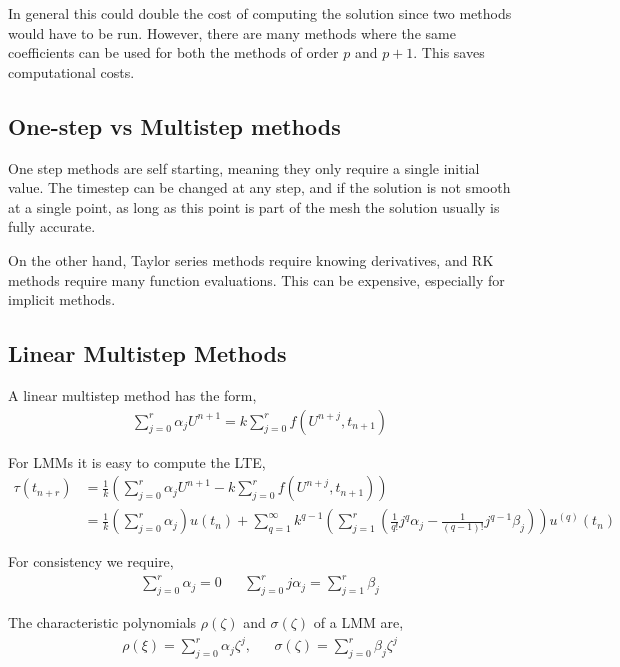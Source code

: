 \documentclass[12pt]{article}
\begin{document}
In general this could double the cost of computing the solution since two methods would have to be run. However, there are many methods where the same coefficients can be used for both the methods of order \( p \) and \( p+1 \). This saves computational costs.

\subsection{One-step vs Multistep methods}
One step methods are self starting, meaning they only require a single initial value. The timestep can be changed at any step, and if the solution is not smooth at a single point, as long as this point is part of the mesh the solution usually is fully accurate.

On the other hand, Taylor series methods require knowing derivatives, and RK methods require many function evaluations. This can be expensive, especially for implicit methods.

\subsection{Linear Multistep Methods}

\begin{definition}
A linear multistep method has the form,
\begin{align*}
    \sum_{j=0}^{r} \alpha_j U^{n+1} = k \sum_{j=0}^{r} f(U^{n+j},t_{n+1})
\end{align*}
\end{definition}

For LMMs it is easy to compute the LTE,
\begin{align*}
    \tau(t_{n+r}) &= \frac{1}{k} \left( \sum_{j=0}^{r} \alpha_j U^{n+1} - k \sum_{j=0}^{r} f(U^{n+j},t_{n+1}) \right) \\
    &= \frac{1}{k} \left( \sum_{j=0}^{r} \alpha_j \right) u(t_n) + \sum_{q=1}^{\infty} k^{q-1} \left( \sum_{j=1}^{r} \left( \frac{1}{q!}j^q \alpha_j - \frac{1}{(q-1)!}j^{q-1} \beta_j  \right) \right) u^{(q)}(t_n)
\end{align*}

For consistency we require,
\begin{align*}
    \sum_{j=0}^{r} \alpha_j  = 0 &&
    \sum_{j=0}^{r} j \alpha_j = \sum_{j=1}^{r} \beta_j
\end{align*}

\begin{definition}
The characteristic polynomials \( \rho(\zeta) \) and \( \sigma(\zeta) \) of a LMM are,
\begin{align*}
    \rho(\xi) = \sum_{j=0}^{r} \alpha_j \zeta^j, && \sigma(\zeta) = \sum_{j=0}^{r} \beta_j \zeta^j
\end{align*}
\end{definition}
\end{document}
